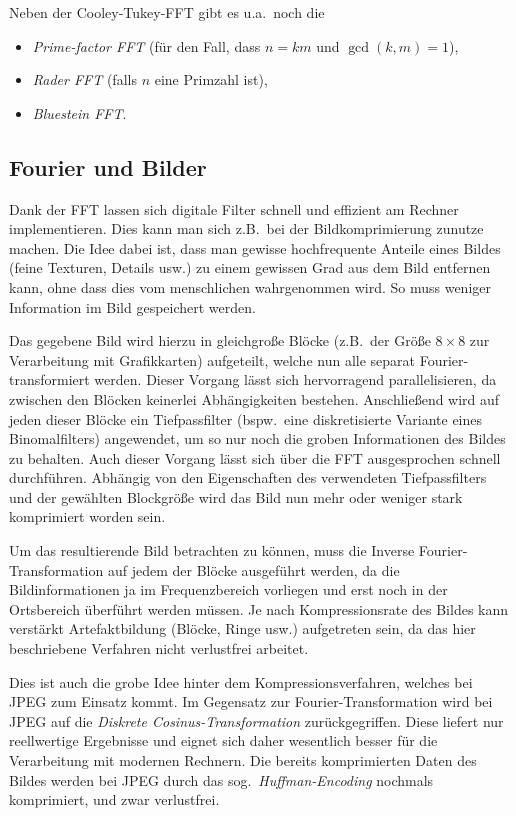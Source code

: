 Neben der Cooley-Tukey-FFT gibt es u.a.\ noch die
\begin{itemize}
\item \emph{Prime-factor FFT} (für den Fall, dass $ n = km $ und $ \gcd(k,m) = 1 $),
\item \emph{Rader FFT} (falls $ n $ eine Primzahl ist),
\item \emph{Bluestein FFT}.
\end{itemize}

\subsection{Fourier und Bilder}

Dank der FFT lassen sich digitale Filter schnell und effizient am Rechner implementieren. Dies kann
man sich z.B.\ bei der Bildkomprimierung zunutze machen. Die Idee dabei ist, dass man gewisse
hochfrequente Anteile eines Bildes (feine Texturen, Details usw.) zu einem gewissen Grad aus dem
Bild entfernen kann, ohne dass dies vom menschlichen wahrgenommen wird. So muss weniger Information
im Bild gespeichert werden.

Das gegebene Bild wird hierzu in gleichgroße Blöcke (z.B.\ der Größe $ 8 \times 8 $ zur 
Verarbeitung mit Grafikkarten) aufgeteilt, welche nun alle separat Fourier-transformiert werden.
Dieser Vorgang lässt sich hervorragend parallelisieren, da zwischen den Blöcken keinerlei 
Abhängigkeiten bestehen. Anschließend wird auf jeden dieser Blöcke ein Tiefpassfilter (bspw.\ eine 
diskretisierte Variante eines Binomalfilters) angewendet, um so nur noch die groben Informationen
des Bildes zu behalten. Auch dieser Vorgang lässt sich über die FFT ausgesprochen schnell 
durchführen. Abhängig von den Eigenschaften des verwendeten Tiefpassfilters und der gewählten 
Blockgröße wird das Bild nun mehr oder weniger stark komprimiert worden sein.

Um das resultierende Bild betrachten zu können, muss die Inverse Fourier-Transformation auf jedem 
der Blöcke ausgeführt werden, da die Bildinformationen ja im Frequenzbereich vorliegen und erst 
noch in der Ortsbereich überführt werden müssen. Je nach Kompressionsrate des Bildes kann verstärkt 
Artefaktbildung (Blöcke, Ringe usw.) aufgetreten sein, da das hier beschriebene Verfahren nicht 
verlustfrei arbeitet.

Dies ist auch die grobe Idee hinter dem Kompressionsverfahren, welches bei JPEG zum Einsatz kommt. 
Im Gegensatz zur Fourier-Transformation wird bei JPEG auf die \emph{Diskrete Cosinus-Transformation}
zurückgegriffen. Diese liefert nur reellwertige Ergebnisse und eignet sich daher wesentlich besser
für die Verarbeitung mit modernen Rechnern. Die bereits komprimierten Daten des Bildes werden bei
JPEG durch das sog.\ \emph{Huffman-Encoding} nochmals komprimiert, und zwar verlustfrei.

